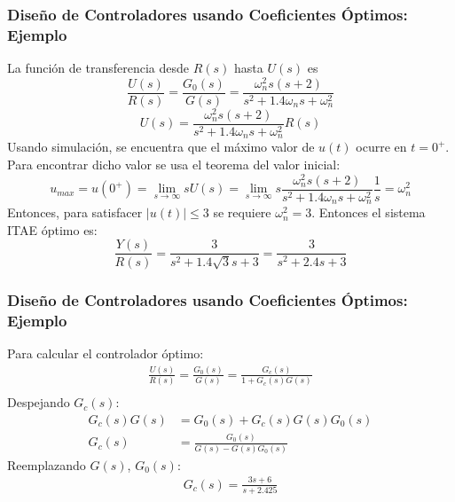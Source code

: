\documentclass[aspectratio=169]{beamer}
\theoremstyle{definition}
\theoremstyle{plain}
\theoremstyle{remark}
\begin{document}
\begin{frame}[<+->]\frametitle{Diseño de Controladores usando Coeficientes Óptimos: Ejemplo}
La función de transferencia desde $R(s)$ hasta $U(s)$ es
\begin{equation*}
	\frac{U(s)}{R(s)} = \frac{G_0(s)}{G(s)} = \frac{\omega_n^2 s (s+2)}{s^2 + 1.4 \omega_n s + \omega_n^2}
\end{equation*}
\begin{equation*}
	U(s) = \frac{\omega_n^2 s (s+2)}{s^2 + 1.4 \omega_n s + \omega_n^2} R(s)
\end{equation*}
Usando simulación, se encuentra que el máximo valor de $u(t)$ ocurre en $t = 0^+$. Para encontrar dicho valor se usa el teorema del valor inicial:
\begin{equation*}
	u_{max} = u(0^+) = \lim_{s \rightarrow \infty} s U(s) = \lim_{s \rightarrow \infty} s \frac{\omega_n^2 s (s+2)}{s^2 + 1.4 \omega_n s + \omega_n^2} \frac{1}{s} = \omega_n^2
\end{equation*}
Entonces, para satisfacer $|u(t)| \leq 3$ se requiere $\omega_n^2 = 3$. Entonces el sistema ITAE óptimo es:
\begin{equation*}
	\frac{Y(s)}{R(s)} = \frac{3}{s^2 + 1.4 \sqrt{3} s + 3} = \frac{3}{s^2 + 2.4 s + 3} 
\end{equation*}
\end{frame}

\begin{frame}[<+->]\frametitle{Diseño de Controladores usando Coeficientes Óptimos: Ejemplo}
	Para calcular el controlador óptimo:
	\begin{align*}
		\frac{U(s)}{R(s)} = \frac{G_0(s)}{G(s)} = \frac{G_c(s)}{1 + G_c(s)G(s)}\\
	\end{align*}
	Despejando $G_c(s)$:
	\begin{align*}
		G_c(s)G(s) &= G_0(s) + G_c(s) G(s) G_0(s)\\
		G_c(s) &= \frac{G_0(s)}{G(s) - G(s)G_0(s)}
	\end{align*}
	Reemplazando $G(s)$, $G_0(s)$:
	\begin{align*}
		G_c(s) = \frac{3s + 6}{s + 2.425}
	\end{align*}
\end{frame}
\end{document}
